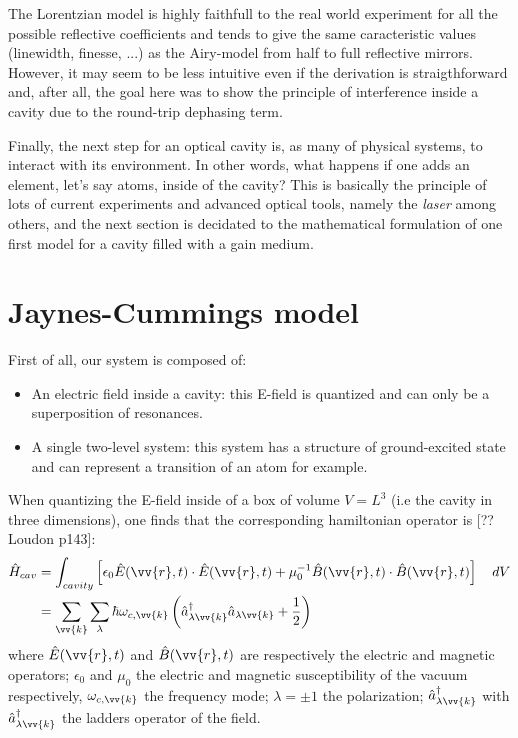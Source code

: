 \documentclass[11pt]{report}
\begin{document}
The Lorentzian model is highly faithfull to the real world experiment for all the possible reflective coefficients and tends to give the same caracteristic values (linewidth, finesse, ...) as the Airy-model from half to full reflective mirrors. However, it may seem to be less intuitive even if the derivation is straigthforward and, after all, the goal here was to show the principle of interference inside a cavity due to the round-trip dephasing term.

Finally, the next step for an optical cavity is, as many of physical systems, to interact with its environment. In other words, what happens if one adds an element, let's say atoms, inside of the cavity? This is basically the principle of lots of current experiments and advanced optical tools, namely the \textit{laser} among others, and the next section is decidated to the mathematical formulation of one first model for a cavity filled with a gain medium.

\section{Jaynes-Cummings model}

First of all, our system is composed of:
\begin{itemize}
	\item An electric field inside a cavity: this E-field is quantized and can only be a superposition of resonances.
	\item A single two-level system: this system has a structure of ground-excited state and can represent a transition of an atom for example.
\end{itemize}

When quantizing the E-field inside of a box of volume $V = L^3$ (i.e the cavity in three dimensions), one finds that the corresponding hamiltonian operator is [??Loudon p143]:
\begin{align}
\hat{H}_{cav} &= \int_{cavity} \left[\epsilon_0 \hat{E}(\vv{r}, t) \cdot \hat{E}(\vv{r}, t) + \mu_0^{-1} \hat{B}(\vv{r}, t) \cdot \hat{B}(\vv{r}, t)\right] \quad dV\\
&= \sum_{\vv{k}} \sum_{\lambda} \hbar \omega_{c,\vv{k}} \left( \hat{a}_{\lambda \vv{k}}^\dag \hat{a}_{\lambda \vv{k}} + \frac{1}{2} \right)
\end{align}
where $\hat{E}(\vv{r}, t)$ and $\hat{B}(\vv{r}, t)$ are respectively the electric and magnetic operators; $\epsilon_0$ and $\mu_0$ the electric and magnetic susceptibility of the vacuum respectively, $\omega_{c,\vv{k}}$ the frequency mode; $\lambda=\pm 1$ the polarization; $\hat{a}_{\lambda \vv{k}}^\dag$ with $\hat{a}_{\lambda \vv{k}}^\dag$ the ladders operator of the field.
\end{document}
